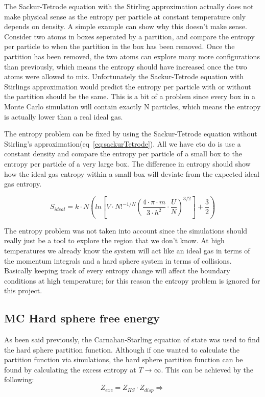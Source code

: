 The Sackur-Tetrode equation with the Stirling approximation actually does not make physical sense as the entropy per particle at constant temperature only depends on density. A simple example can show why this doesn't make sense. Consider two atoms in boxes seperated by a partition, and compare the entropy per particle to when the partition in the box has been removed. Once the partition has been removed, the two atoms can explore many more configurations than previously, which means the entropy should have increased once the two atoms were allowed to mix. Unfortunately the Sackur-Tetrode equation with Stirlings approximation would predict the entropy per particle with or without the partition should be the same. This is a bit of a problem since every box in a Monte Carlo simulation will contain exactly N particles, which means the entropy is actually lower than a real ideal gas.

The entropy problem can be fixed by using the Sackur-Tetrode equation without Stirling's approximation(eq~\ref{eq:sackurTetrode}). All we have eto do is use a constant density and compare the entropy per particle of a small box to the entropy per particle of a very large box. The difference in entropy should show how the ideal gas entropy within a small box will deviate from the expected ideal gas entropy.

\begin{equation}\label{eq:sackurTetrode}
S_{ideal}=k\cdot N \left ( ln\left [ V\cdot N!^{-1/N}\left ( \frac{4\cdot \pi\cdot m}{3\cdot h^2}\cdot\frac{U}{N} \right)^{3/2}  \right]+\frac{3}{2}\right )
\end{equation}

The entropy problem was not taken into account since the simulations should really just be a tool to explore the region that we don't know. At high temperatures we already know the system will act like an ideal gas in terms of the momentum integrals and a hard sphere system in terms of collisions. Basically keeping track of every entropy change will affect the boundary conditions at high temperature; for this reason the entropy problem is ignored for this project.


\subsection{MC Hard sphere free energy}
As been said previously, the Carnahan-Starling equation of state was used to find the hard sphere partition function. Although if one wanted to calculate the partition function via simulations, the hard sphere partition function can be found by calculating the excess entropy at $T\to\infty$. This can be achieved by the following:
\begin{equation}\label{eq:MCHS1}
Z_{exc}=Z_{HS}\cdot Z_{disp}\Rightarrow
\end{equation}

